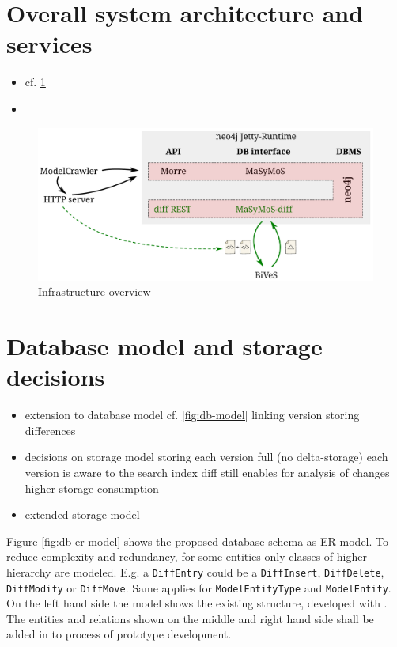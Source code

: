 \section{Overall system architecture and services}
\begin{itemize}
	\item cf. \ref{fig:system-overview}
	\item {}
\end{itemize}

\begin{figure}[h]
	\centering
	\includegraphics[width=\textwidth]{resources/system-overview-matrix.pdf}
	\caption{Infrastructure overview}
	\label{fig:system-overview}
\end{figure}

\section{Database model and storage decisions}
\begin{itemize}
\item extension to database model cf. \ref{fig:db-model}
	\subitem linking version
	\subitem storing differences
\item decisions on storage model
	\subitem storing each version full (no delta-storage)
	\subitem each version is aware to the search index
	\subitem diff still enables for analysis of changes
	\subitem higher storage consumption
\item extended storage model
\end{itemize}

Figure \ref{fig:db-er-model} shows the proposed database schema as ER model. To reduce complexity and redundancy, for some entities only classes of higher hierarchy are modeled. E.g. a \texttt{DiffEntry} could be a \texttt{DiffInsert}, \texttt{DiffDelete}, \texttt{DiffModify} or \texttt{DiffMove}. Same applies for \texttt{ModelEntityType} and \texttt{ModelEntity}.
On the left hand side the model shows the existing structure, developed with \masymos. The entities and relations shown on the middle and right hand side shall be added in to process of prototype development.

